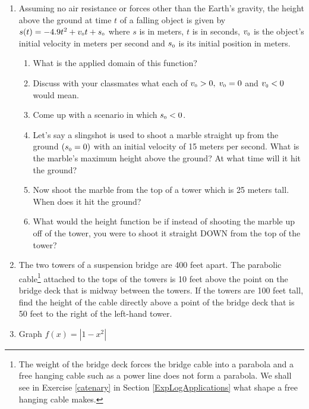 \begin{enumerate}
\item Assuming no air resistance or forces other than the Earth's gravity, the height above the ground at time $t$ of a falling object is given by $s(t) = -4.9t^{2} + v_{\mbox{\tiny $0$}}t + s_{\mbox{\tiny $0$}}$ where $s$ is in meters, $t$ is in seconds, $v_{\mbox{\tiny $0$}}$ is the object's initial velocity in meters per second and $s_{\mbox{\tiny $0$}}$ is its initial position in meters.  
\label{whatgoesup}

\begin{enumerate}

\item What is the applied domain of this function?
\item Discuss with your classmates what each of $v_{\mbox{\tiny $0$}} > 0, \; v_{\mbox{\tiny $0$}} = 0$ and $v_{\mbox{\tiny $0$}} < 0$ would mean.
\item Come up with a scenario in which $s_{\mbox{\tiny $0$}} < 0$.
\item Let's say a slingshot is used to shoot a marble straight up from the ground $(s_{\mbox{\tiny $0$}} = 0)$ with an initial velocity of 15 meters per second.  What is the marble's maximum height above the ground?  At what time will it hit the ground?
\item Now shoot the marble from the top of a tower which is 25 meters tall.  When does it hit the ground?
\item What would the height function be if instead of shooting the marble up off of the tower, you were to shoot it straight DOWN from the top of the tower?

\end{enumerate}


\item \label{parabolicbridgecable} The two towers of a suspension bridge are 400 feet apart.  The parabolic cable\footnote{The weight of the bridge deck forces the bridge cable into a parabola and a free hanging cable such as a power line does not form a parabola.  We shall see in Exercise \ref{catenary} in Section \ref{ExpLogApplications} what shape a free hanging cable makes.} attached to the tops of the towers is 10 feet above the point on the bridge deck that is midway between the towers.  If the towers are 100 feet tall, find the height of the cable directly above a point of the bridge deck that is 50 feet to the right of the left-hand tower.



\item Graph $f(x) = |1 - x^{2}|$


\end{enumerate}
